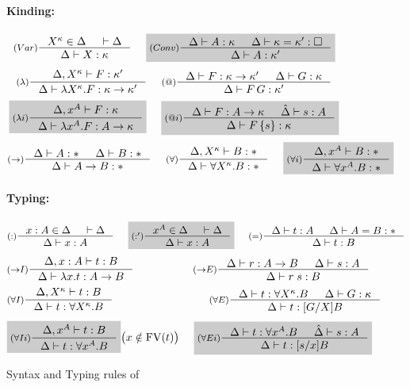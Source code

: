 \begin{figure}
\begin{framed}
\paragraph{Kinding:}
\[ \inference[($Var$)]{X^\kappa\in\Delta & |- \Delta}
                       {\Delta |- X : \kappa}
 ~~~~ \newFi{
   \inference[($Conv$)]{ \Delta |- A : \kappa
                       & \Delta |- \kappa = \kappa' : \square }
                       {\Delta |- A : \kappa'} }
\]
\[
   \inference[($\lambda$)]{\Delta,X^\kappa |- F : \kappa'}
                          {\Delta |- \lambda X^\kappa.F : \kappa->\kappa'}
 ~~~~
   \inference[($@$)]{ \Delta |- F : \kappa -> \kappa'
                    & \Delta |- G : \kappa }
                    {\Delta |- F\,G : \kappa'}
\]
\[ \newFi{
   \inference[($\lambda i$)]{\Delta,x^A |- F : \kappa}
                            {\Delta |- \lambda x^A.F : A->\kappa} }
 ~~~~ \newFi{
   \inference[($@i$)]{ \Delta |- F : A -> \kappa
                     & \hat\Delta |- s : A }
                     {\Delta |- F\,\{s\} : \kappa} }
\]
\[ \inference[($->$)]{\Delta |- A : * & \Delta |- B : *}
                     {\Delta |- A -> B : * }
 ~~~~
   \inference[($\forall$)]{\Delta, X^\kappa |- B : *}
                          {\Delta |- \forall X^\kappa . B : *}
 ~~~~ \newFi{
   \inference[($\forall i$)]{\Delta, x^A |- B : *}
                            {\Delta |- \forall x^A . B : *} }
\]

\paragraph{Typing:}
\[ \inference[($:$)]{x:A \in \Delta & |- \Delta} 
                    {\Delta |- x:A}
 ~~~~ \newFi{
   \inference[($:'$)]{x^A \in \Delta & |- \Delta} 
                     {\Delta |- x:A} }
 ~~~~
   \inference[($=$)]{\Delta |- t :A & \Delta |- A = B : *}
                    {\Delta |- t : B}
\]
\[
   \inference[($->$$I$)]{\Delta, x:A |- t : B}
                        {\Delta |- \lambda x.t : A -> B}
 ~~~~ ~~~~ ~~~~ ~~~~
   \inference[($->$$E$)]{\Delta |- r : A -> B & \Delta |- s : A}
                        {\Delta |- r\;s : B}
\]
\[ \inference[($\forall I$)]{\Delta, X^\kappa |- t : B}
                            {\Delta |- t : \forall X^\kappa.B}
 ~~~~ ~~~~ ~~~~ ~~~~ ~~~~ ~~~~ ~~
   \inference[($\forall E$)]{ \Delta |- t : \forall X^\kappa.B
                            & \Delta |- G:\kappa }
                            {\Delta |- t : [G/X]B}
\]
\[ \newFi{
   \inference[($\forall I i$)]{\Delta, x^A |- t : B}
                              {\Delta |- t : \forall x^A.B} }
     \big( x\notin\FV(t) \big)
 ~~~~ \newFi{
   \inference[($\forall E i$)]{ \Delta |- t : \forall x^A.B
                              & \hat\Delta |- s:A}
                              {\Delta |- t : [s/x]B} }
\]
\end{framed}
\caption{Syntax and Typing rules of \Fi}
\label{fig:Fi}
\end{figure}

